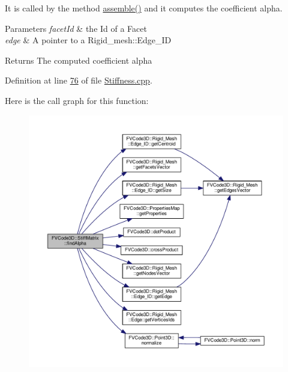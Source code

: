 It is called by the method \hyperlink{classFVCode3D_1_1StiffMatrix_af63e81815a2ba8bd62a2156a80adce55}{assemble()} and it computes the coefficient alpha. 


\begin{DoxyParams}{Parameters}
{\em facet\+Id} & the Id of a Facet \\
\hline
{\em edge} & A pointer to a Rigid\+\_\+mesh\+::\+Edge\+\_\+\+ID \\
\hline
\end{DoxyParams}
\begin{DoxyReturn}{Returns}
The computed coefficient alpha 
\end{DoxyReturn}


Definition at line \hyperlink{Stiffness_8cpp_source_l00076}{76} of file \hyperlink{Stiffness_8cpp_source}{Stiffness.\+cpp}.



Here is the call graph for this function\+:
\nopagebreak
\begin{figure}[H]
\begin{center}
\leavevmode
\includegraphics[width=350pt]{classFVCode3D_1_1StiffMatrix_ae11e5b16122aed418d90e18530007e11_cgraph}
\end{center}
\end{figure}


